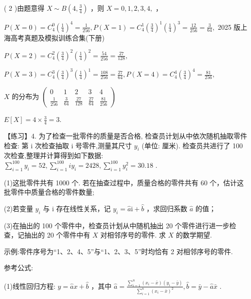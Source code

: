 \documentclass[10pt]{article}
\begin{document}
( 2 )由题意得 \(X \sim  B\left( {4,\frac{3}{4}}\right)\) ，则 \(X = 0,1,2,3,4,\) ，

\(P\left( {X = 0}\right)  = {C}_{4}^{0}{\left( \frac{1}{4}\right) }^{4} = \frac{1}{256},P\left( {X = 1}\right)  = {C}_{4}^{1}{\left( \frac{3}{4}\right) }^{1}{\left( \frac{1}{4}\right) }^{3} = \frac{12}{256} = \frac{3}{64},\) 2025 版上海高考真题及模拟训练合集(下册)

\(P\left( {X = 2}\right)  = {C}_{4}^{2}{\left( \frac{3}{4}\right) }^{2}{\left( \frac{1}{4}\right) }^{2} = \frac{54}{256} = \frac{27}{128},\)

\(P\left( {X = 3}\right)  = {C}_{4}^{3}{\left( \frac{3}{4}\right) }^{3}{\left( \frac{1}{4}\right) }^{1} = \frac{108}{256} = \frac{27}{64},P\left( {X = 4}\right)  = {C}_{4}^{4}{\left( \frac{3}{4}\right) }^{4} = \frac{81}{256},\)

\(X\) 的分布为 \(\left( \begin{matrix} 0 & 1 & 2 & 3 & 4 \\  \frac{1}{256} & \frac{3}{64} & \frac{27}{128} & \frac{27}{64} & \frac{81}{256} \end{matrix}\right)\)

\(E\left\lbrack  X\right\rbrack   = 4 \times  \frac{3}{4} = 3.\)

【练习】4. 为了检查一批零件的质量是否合格, 检查员计划从中依次随机抽取零件检查: 第 \(\mathrm{i}\) 次检查抽取 \(\mathrm{i}\) 号零件,测量其尺寸 \({y}_{i}\) (单位: 厘米). 检查员共进行了 100 次检查,整理并计算得到如下数据: \(\mathop{\sum }\limits_{{i = 1}}^{{100}}{y}_{i} = {52},\mathop{\sum }\limits_{{i = 1}}^{{100}}i{y}_{i} = {2428},\mathop{\sum }\limits_{{i = 1}}^{{100}}{y}_{i}^{2} = {30.18}\) .

(1)这批零件共有 1000 个. 若在抽查过程中，质量合格的零件共有 60 个，估计这批零件中质量合格的零件数量;

(2)若变量 \({y}_{i}\) 与 \(\mathrm{i}\) 存在线性关系，记 \({y}_{i} = \widehat{a}\mathrm{i} + \widehat{b}\) ，求回归系数 \(\widehat{a}\) 的值；

(3)在抽出的 100 个零件中，检查员计划从中随机抽出 20 个零件进行进一步检查，记抽出的 20 个零件中有 \(X\) 对相邻序号的零件. 求 \(X\) 的数学期望.

示例:零件序号为“1、2、4、5”与“1、2、3、5”时均恰有 2 对相邻序号的零件.

参考公式:

(1)线性回归方程: \(y = \widehat{a}x + \widehat{b}\) ，其中 \(\widehat{a} = \frac{\mathop{\sum }\limits_{{i = 1}}^{n}\left( {{x}_{i} - \bar{x}}\right) \left( {{y}_{i} - \bar{y}}\right) }{\mathop{\sum }\limits_{{i = 1}}^{n}{\left( {x}_{i} - \bar{x}\right) }^{2}},\widehat{b} = \bar{y} - \widehat{a}\bar{x}\) .
\end{document}
